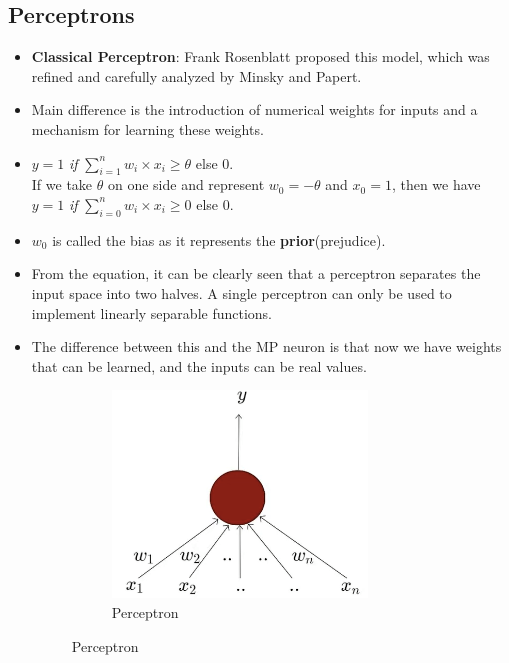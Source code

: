\documentclass[a4paper]{article}
\begin{document}
\subsection{Perceptrons}
\begin{itemize}
    \item \textbf{Classical Perceptron}: Frank Rosenblatt proposed this model, which was refined and carefully analyzed by Minsky and Papert.
    \item Main difference is the introduction of numerical weights for inputs and a mechanism for learning these weights.
    \item $y=1$ \textit{if} $\sum_{i=1}^nw_i\times x_i \geq \theta$ else $0$.\\
    If we take $\theta$ on one side and represent $w_0=-\theta$ and $x_0=1$, then we have\\
    $y=1$ \textit{if} $\sum_{i=0}^nw_i\times x_i\geq 0$ else $0$.
    \item $w_0$ is called the bias as it represents the \textbf{prior}(prejudice).
    \item From the equation, it can be clearly seen that a perceptron separates the input space into two halves. A single perceptron can only be used to implement linearly separable functions.
    \item The difference between this and the MP neuron is that now we have weights that can be learned, and the inputs can be real values.
    \begin{figure}[H]
        \centering
        \begin{subfigure}[b]{0.45\textwidth}
            \includegraphics[width=0.8\textwidth]{Degree//static/DL_classical_perceptron.png}
            \caption{Perceptron}
            \label{fig:DL-perceptron-1}

\end{subfigure}
\end{figure}
\end{itemize}
\end{document}
